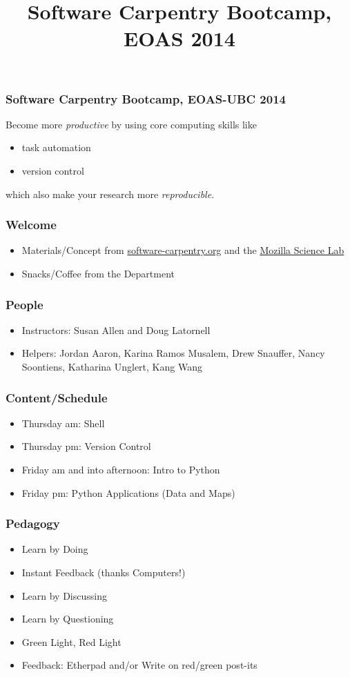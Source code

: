 \documentclass[xcolor=dvipsnames]{beamer}
\title{Software Carpentry Bootcamp, EOAS 2014}
\begin{document}
\begin{frame}
\frametitle{Software Carpentry Bootcamp, EOAS-UBC 2014}
Become more {\em productive} by using core computing skills like
\begin{itemize}
\item task automation
\item version control
\end{itemize}
which also make your research more {\em reproducible}.
\end{frame}

\begin{frame}
\frametitle{Welcome}
\begin{itemize}
\item Materials/Concept from \href{http://software-carpentry.org/}{software-carpentry.org} and the \href{https://wiki.mozilla.org/ScienceLab}{Mozilla Science Lab}
\item Snacks/Coffee from the Department
\end{itemize}
\end{frame}

\begin{frame}
\frametitle{People}
\begin{itemize}
\item Instructors: Susan Allen and Doug Latornell
\item Helpers: Jordan Aaron, Karina Ramos Musalem, Drew Snauffer, Nancy Soontiens, Katharina Unglert, Kang Wang
\end{itemize}
\end{frame}

\begin{frame}
\frametitle{Content/Schedule}
\begin{itemize}
\item Thursday am: Shell
\item Thursday pm: Version Control
\item Friday am and into afternoon: Intro to Python
\item Friday pm: Python Applications (Data and Maps)
\end{itemize}
\end{frame}

\begin{frame}
\frametitle{Pedagogy}
\begin{itemize}
\item Learn by Doing
\item Instant Feedback (thanks Computers!)
\item Learn by Discussing
\item Learn by Questioning
\item Green Light, Red Light
\item Feedback: Etherpad and/or Write on red/green post-its
\end{itemize}
\end{frame}
\end{document}
